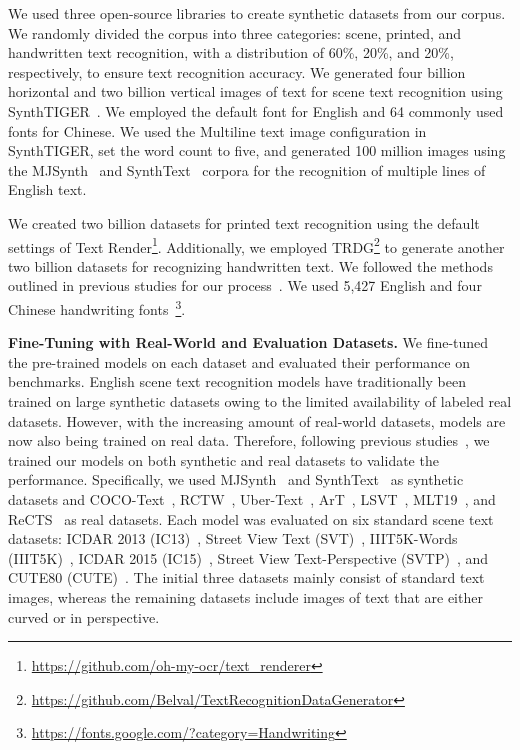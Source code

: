 \documentclass[10pt,twocolumn,letterpaper]{article}
\begin{document}
We used three open-source libraries to create synthetic datasets from our corpus. 
We randomly divided the corpus into three categories: scene, printed, and handwritten text recognition, with a distribution of 60\%, 20\%, and 20\%, respectively, to ensure text recognition accuracy. 
We generated four billion horizontal and two billion vertical images of text for scene text recognition using SynthTIGER~\cite{yim2021synthtiger}.
We employed the default font for English and 64 commonly used fonts for Chinese.
We used the Multiline text image configuration in SynthTIGER, set the word count to five, and generated 100 million images using the MJSynth~\cite{jaderberg2016MJSynth} and SynthText~\cite{gupta2016synthtext} corpora for the recognition of multiple lines of English text. 

We created two billion datasets for printed text recognition using the default settings of Text Render\footnote{\url{https://github.com/oh-my-ocr/text_renderer}}. 
Additionally, we employed TRDG\footnote{\url{https://github.com/Belval/TextRecognitionDataGenerator}} to generate another two billion datasets for recognizing handwritten text. 
We followed the methods outlined in previous studies for our process~\cite{li2021trocr}.
We used 5,427 English and four Chinese handwriting fonts~\footnote{\url{https://fonts.google.com/?category=Handwriting}}.


\noindent
\textbf{Fine-Tuning with Real-World and Evaluation Datasets.}
We fine-tuned the pre-trained models on each dataset and evaluated their performance on benchmarks. 
English scene text recognition models have traditionally been trained on large synthetic datasets owing to the limited availability of labeled real datasets.
However, with the increasing amount of real-world datasets, models are now also being trained on real data. 
Therefore, following previous studies~\cite{baek2021TRBA, bautista2022parseq},
we trained our models on both synthetic and real datasets to validate the performance.
Specifically, we used MJSynth~\cite{jaderberg2016MJSynth} and SynthText~\cite{gupta2016synthtext} as synthetic datasets and COCO-Text~\cite{veit2016coco}, RCTW~\cite{shi2017icdar2017}, Uber-Text~\cite{zhang2017uber}, ArT~\cite{chng2019icdar2019}, LSVT~\cite{sun2019icdar}, MLT19~\cite{nayef2019icdarmlt}, and ReCTS~\cite{zhang2019icdar} as real datasets.
Each model was evaluated on six standard scene text datasets: ICDAR 2013 (IC13)~\cite{karatzas2013icdar}, Street View Text (SVT)~\cite{wang2011svt}, IIIT5K-Words (IIIT5K)~\cite{mishra2012iiit}, ICDAR 2015 (IC15)~\cite{karatzas2015icdar}, Street View Text-Perspective (SVTP)~\cite{phan2013svtp}, and CUTE80 (CUTE)~\cite{risnumawan2014cute80}.
The initial three datasets mainly consist of standard text images, whereas the remaining 
datasets include images of text that are either curved or in perspective.  
\end{document}
